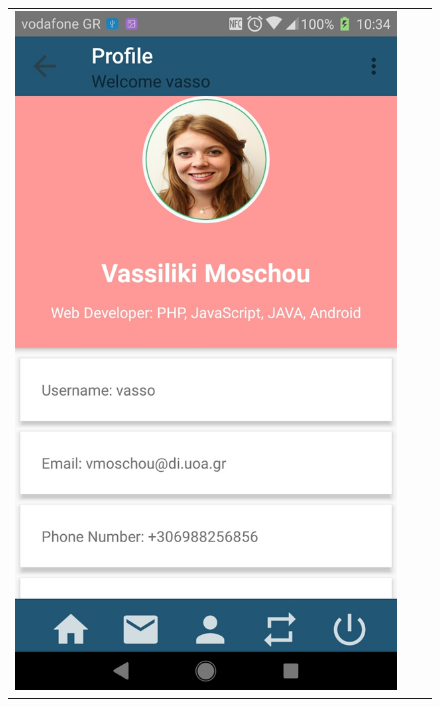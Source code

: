 \documentclass[12pt]{article}
\begin{document}
	\begin{center}
		\begin{figure}
			\begin{tabular}{c c c}
				
				\includegraphics[scale=0.17, keepaspectratio]{17-profile.jpg}  
				&

\end{tabular}
\end{figure}
\end{center}
\end{document}
